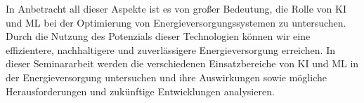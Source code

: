 In Anbetracht all dieser Aspekte ist es von großer Bedeutung, die Rolle von KI
und ML bei der Optimierung von Energieversorgungssystemen zu untersuchen. Durch
die Nutzung des Potenzials dieser Technologien können wir eine effizientere,
nachhaltigere und zuverlässigere Energieversorgung erreichen. In dieser
Seminararbeit werden die verschiedenen Einsatzbereiche von KI und ML in der
Energieversorgung untersuchen und ihre Auswirkungen sowie mögliche
Herausforderungen und zukünftige Entwicklungen analysieren.